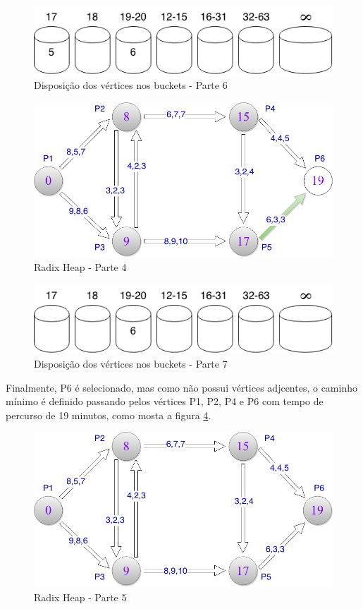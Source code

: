 \begin{figure}[htbp]
\centering
 \includegraphics[width=.50\textwidth]{chapters/fig/buckets6.png}
\caption{Disposição dos vértices nos buckets - Parte 6}
\label{fig:buckets6}
\end{figure}

\begin{figure}[htbp]
\centering
 \includegraphics[width=.50\textwidth]{chapters/fig/limitesup4.png}
\caption{Radix Heap - Parte 4}
\label{fig:limitesup4}
\end{figure}

\begin{figure}[htbp]
\centering
 \includegraphics[width=.50\textwidth]{chapters/fig/buckets7.png}
\caption{Disposição dos vértices nos buckets - Parte 7}
\label{fig:buckets7}
\end{figure}
\FloatBarrier

Finalmente, P6 é selecionado, mas como não possui vértices adjcentes, o caminho mínimo é definido passando
pelos vértices P1, P2, P4 e P6 com tempo de percurso de 19 minutos, como mosta a figura \ref{fig:limitesup5}.

\begin{figure}[htbp]
\centering
 \includegraphics[width=.50\textwidth]{chapters/fig/limitesup5.png}
\caption{Radix Heap - Parte 5}
\label{fig:limitesup5}
\end{figure}
\FloatBarrier


